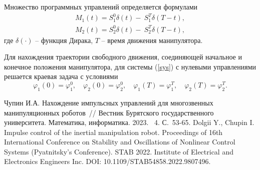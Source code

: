 Множество программных управлений определяется формулами
\begin{equation*}
	\begin{aligned}
		M_1(t)=S_1^0 \delta (t) - \: S_1^T \delta (T-t),\\
		M_2(t)=S_2^0 \delta (t) -\: S_2^T \delta (T-t),
	\end{aligned}
	\label{zv}
\end{equation*}
где $\delta(\cdot)$ -- функция Дирака, $T$ -- время движения манипулятора. 

Для нахождения траектории свободного движения, соединяющей начальное и конечное положения манипулятора, для системы (\ref{sys}) с нулевыми управлениями решается краевая задача с условиями
 \begin{equation*}
	\varphi_1(0)=\varphi_1^0, \quad \varphi_2(0)=\varphi_2^0, \quad \varphi_1(T)=\varphi_1^T, \quad \varphi_2(T)=\varphi_2^T. 
\end{equation*}

\begin{thebibliography}{99}
Чупин И.А. Нахождение импульсных управлений для многозвенных манипуляционных роботов~// Вестник Бурятского государственного университета. Математика, информатика. 2023. \textnumero~4. С.~53-65.
Dolgii Y., Chupin I. Impulse control of the inertial manipulation robot. Proceedings of 16th International Conference on Stability and Oscillations of Nonlinear Control Systems (Pyatnitsky’s Conference). STAB 2022. Institute of Electrical and Electronics Engineers Inc. DOI: 10.1109/STAB54858.2022.9807496.
\end{thebibliography}






%


